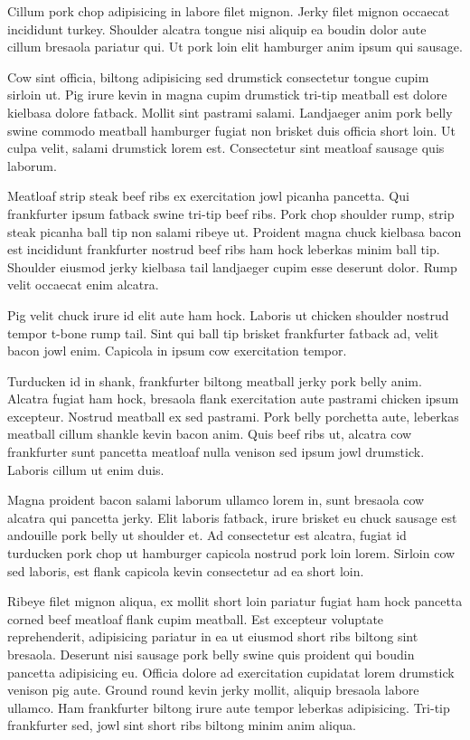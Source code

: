 Cillum pork chop adipisicing in labore filet mignon. Jerky filet mignon occaecat incididunt turkey. Shoulder alcatra tongue nisi aliquip ea boudin dolor aute cillum bresaola pariatur qui. Ut pork loin elit hamburger anim ipsum qui sausage.

Cow sint officia, biltong adipisicing sed drumstick consectetur tongue cupim sirloin ut. Pig irure kevin in magna cupim drumstick tri-tip meatball est dolore kielbasa dolore fatback. Mollit sint pastrami salami. Landjaeger anim pork belly swine commodo meatball hamburger fugiat non brisket duis officia short loin. Ut culpa velit, salami drumstick lorem est. Consectetur sint meatloaf sausage quis laborum.

Meatloaf strip steak beef ribs ex exercitation jowl picanha pancetta. Qui frankfurter ipsum fatback swine tri-tip beef ribs. Pork chop shoulder rump, strip steak picanha ball tip non salami ribeye ut. Proident magna chuck kielbasa bacon est incididunt frankfurter nostrud beef ribs ham hock leberkas minim ball tip. Shoulder eiusmod jerky kielbasa tail landjaeger cupim esse deserunt dolor. Rump velit occaecat enim alcatra.

Pig velit chuck irure id elit aute ham hock. Laboris ut chicken shoulder nostrud tempor t-bone rump tail. Sint qui ball tip brisket frankfurter fatback ad, velit bacon jowl enim. Capicola in ipsum cow exercitation tempor.

Turducken id in shank, frankfurter biltong meatball jerky pork belly anim. Alcatra fugiat ham hock, bresaola flank exercitation aute pastrami chicken ipsum excepteur. Nostrud meatball ex sed pastrami. Pork belly porchetta aute, leberkas meatball cillum shankle kevin bacon anim. Quis beef ribs ut, alcatra cow frankfurter sunt pancetta meatloaf nulla venison sed ipsum jowl drumstick. Laboris cillum ut enim duis.

Magna proident bacon salami laborum ullamco lorem in, sunt bresaola cow alcatra qui pancetta jerky. Elit laboris fatback, irure brisket eu chuck sausage est andouille pork belly ut shoulder et. Ad consectetur est alcatra, fugiat id turducken pork chop ut hamburger capicola nostrud pork loin lorem. Sirloin cow sed laboris, est flank capicola kevin consectetur ad ea short loin.

Ribeye filet mignon aliqua, ex mollit short loin pariatur fugiat ham hock pancetta corned beef meatloaf flank cupim meatball. Est excepteur voluptate reprehenderit, adipisicing pariatur in ea ut eiusmod short ribs biltong sint bresaola. Deserunt nisi sausage pork belly swine quis proident qui boudin pancetta adipisicing eu. Officia dolore ad exercitation cupidatat lorem drumstick venison pig aute. Ground round kevin jerky mollit, aliquip bresaola labore ullamco. Ham frankfurter biltong irure aute tempor leberkas adipisicing. Tri-tip frankfurter sed, jowl sint short ribs biltong minim anim aliqua.

